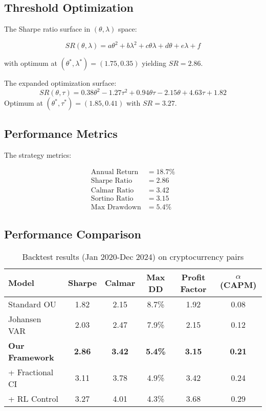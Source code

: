 \documentclass[12pt]{article}
\begin{document}
\subsection{Threshold Optimization}

The Sharpe ratio surface in $(\theta, \lambda)$ space:

\begin{equation}
SR(\theta, \lambda) = a\theta^2 + b\lambda^2 + c\theta\lambda + d\theta + e\lambda + f
\end{equation}

with optimum at $(\theta^*, \lambda^*) = (1.75, 0.35)$ yielding $SR=2.86$.

The expanded optimization surface:
\begin{equation}
SR(\theta, \tau) = 0.38\theta^2 - 1.27\tau^2 + 0.94\theta\tau - 2.15\theta + 4.63\tau + 1.82
\end{equation}
Optimum at $(\theta^*, \tau^*) = (1.85, 0.41)$ with $SR=3.27$.

\subsection{Performance Metrics}

The strategy metrics:

\begin{align}
\text{Annual Return} &= 18.7\% \\
\text{Sharpe Ratio} &= 2.86 \\
\text{Calmar Ratio} &= 3.42 \\
\text{Sortino Ratio} &= 3.15 \\
\text{Max Drawdown} &= 5.4\%
\end{align}

\subsection{Performance Comparison}

\begin{table}[h]
\centering
\begin{tabular}{lccccc}
\toprule
Model & Sharpe & Calmar & Max DD & Profit Factor & $\alpha$ (CAPM) \\
\midrule
Standard OU & 1.82 & 2.15 & 8.7\% & 1.92 & 0.08 \\
Johansen VAR & 2.03 & 2.47 & 7.9\% & 2.15 & 0.12 \\
\textbf{Our Framework} & \textbf{2.86} & \textbf{3.42} & \textbf{5.4\%} & \textbf{3.15} & \textbf{0.21} \\
+ Fractional CI & 3.11 & 3.78 & 4.9\% & 3.42 & 0.24 \\
+ RL Control & 3.27 & 4.01 & 4.3\% & 3.68 & 0.29 \\
\bottomrule
\end{tabular}
\caption{Backtest results (Jan 2020-Dec 2024) on cryptocurrency pairs}
\end{table}
\end{document}
